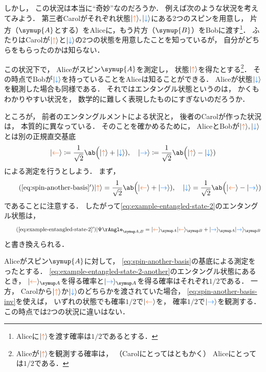 \documentclass[
]{sotsu}
\newcommand{\bitone}{\mathcolor{fire}{\uparrow}}
\newcommand{\bittwo}{\mathcolor{water}{\downarrow}}
\newcommand{\bitthr}{\mathcolor{fire}{\leftarrow}}
\newcommand{\bitfou}{\mathcolor{water}{\rightarrow}}
\begin{document}
しかし，
この状況は本当に``奇妙''なのだろうか．
例えば次のような状況を考えてみよう．
第三者Carolがそれぞれ状態$\ket{\bitone}, \ket{\bittwo}$にある2つのスピンを用意し，
片方（$\symup{A}$とする）をAliceに，もう片方（$\symup{B}$）をBobに渡す\footnote{
    Aliceに$\ket{\bitone}$を渡す確率は$1/2$であるとする．
}．
ふたりはCarolが$\ket{\bitone}$と$\ket{\bittwo}$の2つの状態を用意したことを知っているが，
自分がどちらをもらったのかは知らない．

この状況下で，
Aliceがスピン$\symup{A}$を測定し，
状態$\ket{\bitone}$を得たとする\footnote{
    Aliceが$\ket{\bitone}$を観測する確率は，
    （Carolにとってはともかく）
    Aliceにとっては$1/2$である．
}．
その時点でBobが$\ket{\bittwo}$を持っていることをAliceは知ることができる．
Aliceが状態$\ket{\bittwo}$を観測した場合も同様である．
それではエンタングル状態というのは，
かくもわかりやすい状況を，
数学的に難しく表現したものにすぎないのだろうか．

ところが，
前者のエンタングルメントによる状況と，
後者のCarolが作った状況は，
本質的に異なっている．
そのことを確かめるために，
AliceとBobが$\ket{\bitone}, \ket{\bittwo}$とは別の正規直交基底
\begin{align}
    \label{eq:spin-another-basis}
    \ket{\bitthr} 
    \coloneq \frac{1}{\sqrt{2}} \ab\Big( \ket{\bitone} + \ket{\bittwo} )
    ,
    \quad 
    \ket{\bitfou} 
    \coloneq \frac{1}{\sqrt{2}} \ab\Big( \ket{\bitone} - \ket{\bittwo} )
\end{align}
による測定を行うとしよう．
まず，
\begin{equation}
    \label{eq:spin-another-basis-inv}
    \tag{\ref*{eq:spin-another-basis}$'$}
    \ket{\bitone} = \frac{1}{\sqrt{2}} \ab\Big( \ket{\bitthr} + \ket{\bitfou} ),
    \quad 
    \ket{\bittwo} = \frac{1}{\sqrt{2}} \ab\Big( \ket{\bitthr} - \ket{\bitfou} )
\end{equation}
であることに注意する．
したがって\cref{eq:example-entangled-state-2}のエンタングル状態は，
\begin{equation}
    \label{eq:example-entangled-state-2-another}
    \tag{\ref*{eq:example-entangled-state-2}$'$}
    \Ket{\Psi}<A,B> = \ket{\bitthr}<A> \ket{\bitthr}<B> + \ket{\bitfou}<A> \ket{\bitfou}<B>
\end{equation}
と書き換えられる．

Aliceがスピン$\symup{A}$に対して，
\cref{eq:spin-another-basis}の基底による測定をったとする．
\cref{eq:example-entangled-state-2-another}のエンタングル状態にあるとき，
$\ket{\bitthr}<A>$を得る確率と$\ket{\bitfou}<A>$を得る確率はそれぞれ$1/2$である．
一方，
Carolから$\ket{\bitone}$か$\ket{\bittwo}$のどちらかを渡されていた場合，
\cref{eq:spin-another-basis-inv}を使えば，
いずれの状態でも確率$1/2$で$\ket{\bitthr}$を，
確率$1/2$で$\ket{\bitfou}$を観測する．
この時点では2つの状況に違いはない．
\end{document}
